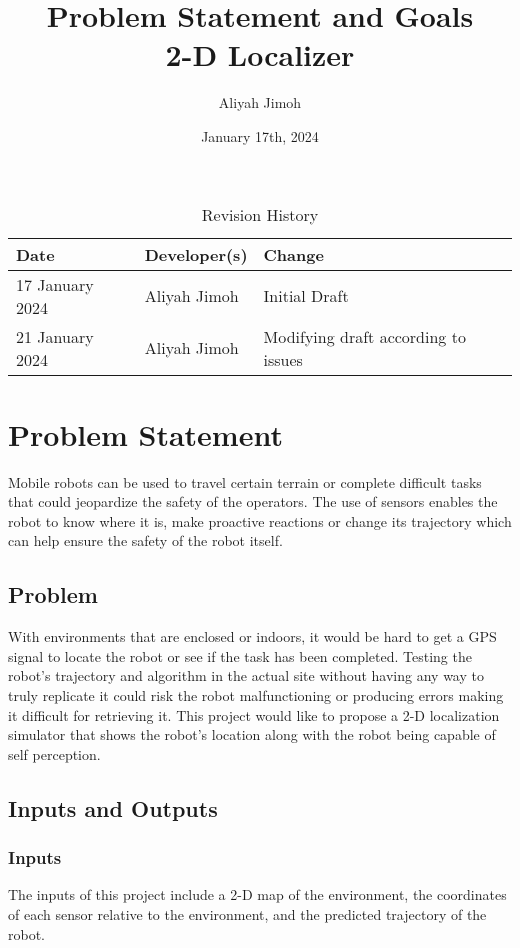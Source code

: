 \documentclass{article}
\title{Problem Statement and Goals\\2-D Localizer}
\author{Aliyah Jimoh}
\date{January 17th, 2024}
\begin{document}
\maketitle

\begin{table}[hp]
\caption{Revision History} \label{TblRevisionHistory}
\begin{tabularx}{\textwidth}{llX}
\toprule
\textbf{Date} & \textbf{Developer(s)} & \textbf{Change}\\
\midrule
17 January 2024 & Aliyah Jimoh & Initial Draft\\
21 January 2024 & Aliyah Jimoh & Modifying draft according to issues\\

\bottomrule
\end{tabularx}
\end{table}

\section{Problem Statement}
Mobile robots can be used to travel certain terrain or complete difficult tasks that could jeopardize the safety of the operators. The use of sensors enables the robot to know where it is, make proactive reactions or change its trajectory which can help ensure the safety of the robot itself.
\subsection{Problem}
With environments that are enclosed or indoors, it would be hard to get a GPS signal to locate the robot or see if the task has been completed. Testing the robot's trajectory and algorithm in the actual site without having any way to truly replicate it could risk the robot malfunctioning or producing errors making it difficult for retrieving it. This project would like to propose a 2-D localization simulator that shows the robot's location along with the robot being capable of self perception.

\subsection{Inputs and Outputs}

\subsubsection{Inputs}
The inputs of this project include a 2-D map of the environment, the coordinates of each sensor relative to the environment, and the predicted trajectory of the robot.
\end{document}
